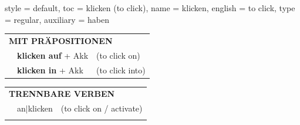 \begin{verbentry}{
  style = {default},
  toc = {klicken (to click)},
  name = {klicken},
  english = {to click},
  type = {regular},
  auxiliary = {haben}
}
\vspace{10pt}

\begin{tabular}{lll}
\multicolumn{3}{l}{\textbf{MIT PRÄPOSITIONEN}}\\
& \textbf{klicken auf} + Akk & (to click on)\\
& \textbf{klicken in} + Akk & (to click into)\\
\end{tabular}
\hfill
\begin{tabular}{lll}
\multicolumn{3}{l}{\textbf{TRENNBARE VERBEN}}\\
& an$|$klicken & (to click on / activate)\\
\vspace{10pt}
\end{tabular}

\vspace{-5pt}
\end{verbentry}

